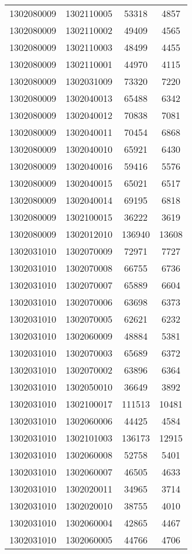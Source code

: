 \begin{longtable}[h]{llcc}
		1302080009 & 1302110005 & 53318 & 4857\\
		1302080009 & 1302110002 & 49409 & 4565\\
		1302080009 & 1302110003 & 48499 & 4455\\
		1302080009 & 1302110001 & 44970 & 4115\\
		1302080009 & 1302031009 & 73320 & 7220\\
		1302080009 & 1302040013 & 65488 & 6342\\
		1302080009 & 1302040012 & 70838 & 7081\\
		1302080009 & 1302040011 & 70454 & 6868\\
		1302080009 & 1302040010 & 65921 & 6430\\
		1302080009 & 1302040016 & 59416 & 5576\\
		1302080009 & 1302040015 & 65021 & 6517\\
		1302080009 & 1302040014 & 69195 & 6818\\
		1302080009 & 1302100015 & 36222 & 3619\\
		1302080009 & 1302012010 & 136940 & 13608\\
		1302031010 & 1302070009 & 72971 & 7727\\
		1302031010 & 1302070008 & 66755 & 6736\\
		1302031010 & 1302070007 & 65889 & 6604\\
		1302031010 & 1302070006 & 63698 & 6373\\
		1302031010 & 1302070005 & 62621 & 6232\\
		1302031010 & 1302060009 & 48884 & 5381\\
		1302031010 & 1302070003 & 65689 & 6372\\
		1302031010 & 1302070002 & 63896 & 6364\\
		1302031010 & 1302050010 & 36649 & 3892\\
		1302031010 & 1302100017 & 111513 & 10481\\
		1302031010 & 1302060006 & 44425 & 4584\\
		1302031010 & 1302101003 & 136173 & 12915\\
		1302031010 & 1302060008 & 52758 & 5401\\
		1302031010 & 1302060007 & 46505 & 4633\\
		1302031010 & 1302020011 & 34965 & 3714\\
		1302031010 & 1302020010 & 38755 & 4010\\
		1302031010 & 1302060004 & 42865 & 4467\\
		1302031010 & 1302060005 & 44766 & 4706\\

\end{longtable}
